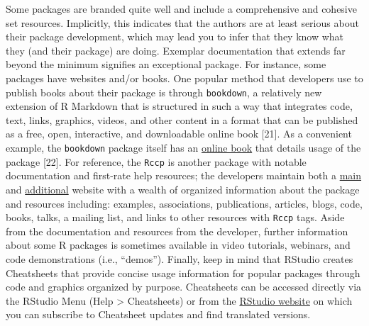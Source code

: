 \documentclass[10pt,letterpaper]{article}
\begin{document}
Some packages are branded quite well and include a comprehensive and
cohesive set resources. Implicitly, this indicates that the authors are
at least serious about their package development, which may lead you to
infer that they know what they (and their package) are doing. Exemplar
documentation that extends far beyond the minimum signifies an
exceptional package. For instance, some packages have websites and/or
books. One popular method that developers use to publish books about
their package is through \texttt{bookdown}, a relatively new extension
of R Markdown that is structured in such a way that integrates code,
text, links, graphics, videos, and other content in a format that can be
published as a free, open, interactive, and downloadable online book
{[}21{]}. As a convenient example, the \texttt{bookdown} package itself
has an \href{https://bookdown.org/yihui/bookdown/}{online book} that
details usage of the package {[}22{]}. For reference, the \texttt{Rccp}
is another package with notable documentation and first-rate help
resources; the developers maintain both a
\href{http://www.rcpp.org/}{main} and
\href{http://dirk.eddelbuettel.com/code/rcpp.html}{additional} website
with a wealth of organized information about the package and resources
including: examples, associations, publications, articles, blogs, code,
books, talks, a mailing list, and links to other resources with
\texttt{Rccp} tags. Aside from the documentation and resources from the
developer, further information about some R packages is sometimes
available in video tutorials, webinars, and code demonstrations (i.e.,
``demos''). Finally, keep in mind that RStudio creates Cheatsheets that
provide concise usage information for popular packages through code and
graphics organized by purpose. Cheatsheets can be accessed directly via
the RStudio Menu (Help \textgreater{} Cheatsheets) or from the
\href{https://rstudio.com/resources/cheatsheets/}{RStudio website} on
which you can subscribe to Cheatsheet updates and find translated
versions.
\end{document}
